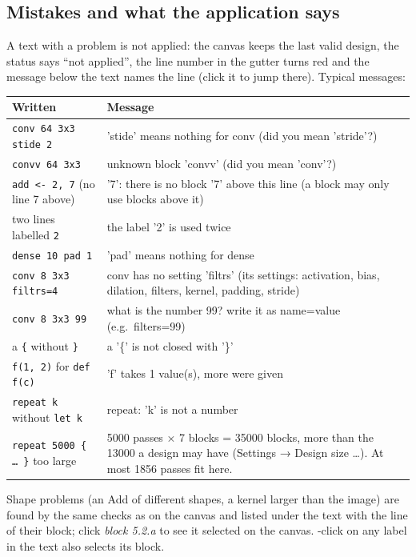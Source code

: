 \subsection{Mistakes and what the application says}
\label{sec:text-errors}
A text with a problem is not applied: the canvas keeps the last valid design, the status says ``not applied'', the line number in the
gutter turns red and the message below the text names the line (click it to jump there). Typical messages:
\begin{longtable}{@{}p{4.6cm}p{10.4cm}@{}}
\toprule
\textbf{Written} & \textbf{Message}\\
\midrule\endhead
\texttt{conv 64 3x3 stide 2} & 'stide' means nothing for conv (did you mean 'stride'?)\\
\texttt{convv 64 3x3} & unknown block 'convv' (did you mean 'conv'?)\\
\texttt{add <- 2, 7} (no line 7 above) & '7': there is no block '7' above this line (a block may only use blocks above it)\\
two lines labelled \texttt{2} & the label '2' is used twice\\
\texttt{dense 10 pad 1} & 'pad' means nothing for dense\\
\texttt{conv 8 3x3 filtrs=4} & conv has no setting 'filtrs' (its settings: activation, bias, dilation, filters, kernel, padding, stride)\\
\texttt{conv 8 3x3 99} & what is the number 99? write it as name=value (e.g.\ filters=99)\\
a \texttt{\{} without \texttt{\}} & a '\{' is not closed with '\}'\\
\texttt{f(1, 2)} for \texttt{def f(c)} & 'f' takes 1 value(s), more were given\\
\texttt{repeat k} without \texttt{let k} & repeat: 'k' is not a number\\
\texttt{repeat 5000 \{ \dots\ \}} too large & 5000 passes × 7 blocks = 35000 blocks, more than the 13000 a design may have (Settings → Design size \dots). At most 1856 passes fit here.\\
\bottomrule
\end{longtable}
Shape problems (an Add of different shapes, a kernel larger than the image) are found by the same checks as on the canvas and listed under
the text with the line of their block; click \emph{block 5.2.a} to see it selected on the canvas. -click on any label in the text
also selects its block.

